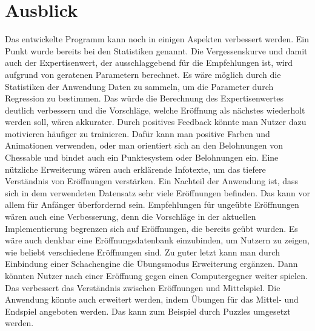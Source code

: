 \section{Ausblick}
Das entwickelte Programm kann noch in einigen Aspekten verbessert werden. Ein Punkt wurde bereits bei den Statistiken genannt. Die Vergessenskurve und damit auch der Expertisenwert, der ausschlaggebend für die Empfehlungen ist, wird aufgrund von geratenen Parametern berechnet. Es wäre möglich durch die Statistiken der Anwendung Daten zu sammeln, um die Parameter durch Regression zu bestimmen. Das würde die Berechnung des Expertisenwertes deutlich verbessern und die Vorschläge, welche Eröffnung als nächstes wiederholt werden soll, wären akkurater.
Durch positives Feedback könnte man Nutzer dazu motivieren häufiger zu trainieren. Dafür kann man positive Farben und Animationen verwenden, oder man orientiert sich an den Belohnungen von Chessable und bindet auch ein Punktesystem oder Belohnungen ein.
Eine nützliche Erweiterung wären auch erklärende Infotexte, um das tiefere Verständnis von Eröffnungen verstärken.
Ein Nachteil der Anwendung ist, dass sich in dem verwendeten Datensatz sehr viele Eröffnungen befinden. Das kann vor allem für Anfänger überfordernd sein. Empfehlungen für ungeübte Eröffnungen wären auch eine Verbesserung, denn die Vorschläge in der aktuellen Implementierung begrenzen sich auf Eröffnungen, die bereits geübt wurden. Es wäre auch denkbar eine Eröffnungsdatenbank einzubinden, um Nutzern zu zeigen, wie beliebt verschiedene Eröffnungen sind.
Zu guter letzt kann man durch Einbindung einer Schachengine die Übungsmodus Erweiterung ergänzen. Dann könnten Nutzer nach einer Eröffnung gegen einen Computergegner weiter spielen. Das verbessert das Verständnis zwischen Eröffnungen und Mittelspiel.
Die Anwendung könnte auch erweitert werden, indem Übungen für das Mittel- und Endspiel angeboten werden. Das kann zum Beispiel durch Puzzles umgesetzt werden.
